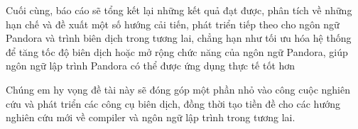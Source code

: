Cuối cùng, báo cáo sẽ tổng kết lại những kết quả đạt được, phân tích về những
hạn chế và đề xuất một số hướng cải tiến, phát triển tiếp theo cho ngôn ngữ Pandora và 
trình biên dịch  trong tương lai, chẳng hạn như tối ưu hóa hệ thống để tăng tốc độ biên 
dịch hoặc mở rộng chức năng của ngôn ngữ Pandora, giúp ngôn ngữ lập trình Pandora có thể 
được ứng dụng thực tế tốt hơn

Chúng em hy vọng đề tài này sẽ đóng góp một phần nhỏ vào công cuộc nghiên cứu và phát 
triển các công cụ biên dịch, đồng thời tạo tiền đề cho các hướng nghiên cứu mới về 
compiler và ngôn ngữ lập trình trong tương lai.

